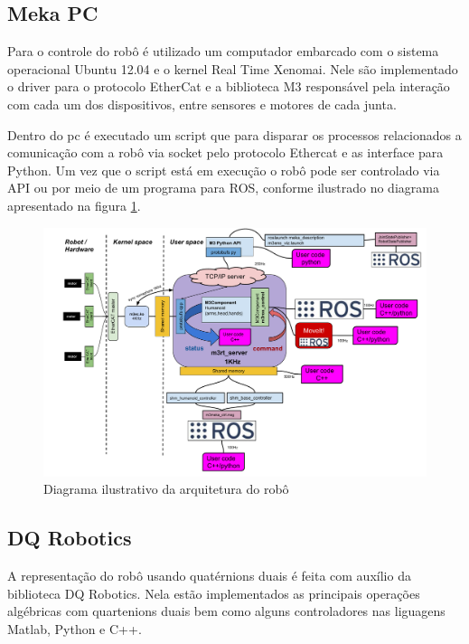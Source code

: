 
\subsection{Meka PC}

Para o controle do robô é utilizado um computador embarcado com o sistema operacional Ubuntu 12.04 e o kernel Real Time Xenomai. Nele são implementado o driver para o protocolo EtherCat e a biblioteca M3 responsável pela interação com cada um dos dispositivos, entre sensores e motores de cada junta.

Dentro do pc é executado um script que para disparar os processos relacionados a comunicação com a robô via socket pelo protocolo Ethercat e as interface para Python. Um vez que o script está em execução o robô pode ser controlado via API ou por meio de um programa para ROS, conforme ilustrado no diagrama apresentado na figura \ref{fig:m3arch}.



\begin{figure}[ht]
    \centering
    \includegraphics[width=\linewidth]{figs/m3_arch.pdf}
    \caption{Diagrama ilustrativo da arquitetura do robô}
    \label{fig:m3arch}
\end{figure}
\subsection{DQ Robotics}

A representação do robô usando quatérnions duais é feita com auxílio da biblioteca DQ Robotics. Nela estão implementados as principais operações algébricas com quartenions duais bem como alguns controladores nas liguagens Matlab, Python e C++.

